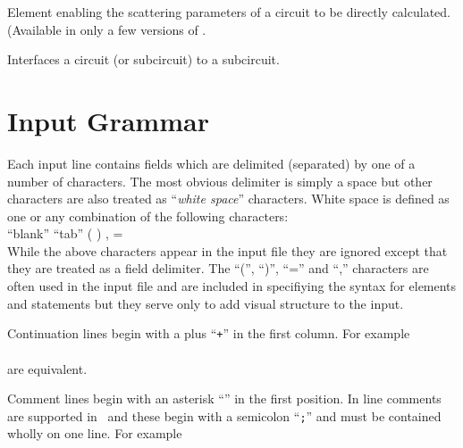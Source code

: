 Element enabling the scattering parameters of a circuit to be directly
calculated. (Available in only a few versions of \justspice .


{}

Interfaces a circuit (or subcircuit) to a subcircuit.

\section{Input Grammar}

Each input line contains fields which are delimited (separated) by one of a
number of characters.  The most obvious delimiter is simply a space
but other characters are also treated
as ``{\it white space}'' characters.
White space is defined as one or any
combination of the following characters:\\[0.1in]
\offset ``blank'' \hspace{0.3in}
``tab'' \hspace{0.3in}
( \hspace{0.3in}
) \hspace{0.3in}
, \hspace{0.3in}
=\\
While the above characters appear in the input file they are ignored except
that they are treated as a field delimiter. The
``('', ``)'', ``='' and ``,'' characters are often used in the input file
and are included in specifiying the syntax for elements and statements but
they serve only to add visual structure to the input.

Continuation lines begin with a plus ``{\tt +}'' in the
first column. For example\\[0.05in]
\hspace*{\fill}\\[0.05in]
are equivalent.

Comment lines begin with an asterisk ``{\tt *}'' in the first position.
In line comments are supported in \pspice\ and these begin with a semicolon
``{\tt ;}'' and must be contained wholly on one line. For example
\hspace*{\fill}\\[0.05in]


